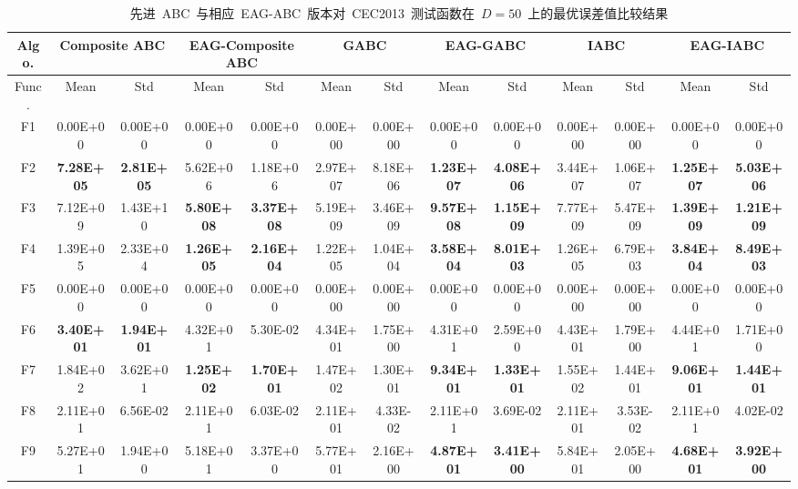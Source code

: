 \begin{table*}[!ht]
  \centering
  \caption{先进~ABC~与相应~EAG-ABC~版本对~CEC2013~测试函数在~$D=50$~上的最优误差值比较结果}
  \tiny
    \begin{tabular}{|c|cc|cc|cc|cc|cc|cc|}
    \hline
    Algo.   & \multicolumn{2}{c|}{Composite ABC} & \multicolumn{2}{c|}{EAG-Composite ABC} & \multicolumn{2}{c|}{ GABC } & \multicolumn{2}{c|}{EAG-GABC} & \multicolumn{2}{c|}{ IABC } & \multicolumn{2}{c|}{EAG-IABC} \\
    \hline
    Func.   & Mean  & Std   & Mean  & Std   &  Mean  &  Std  & Mean  & Std   &  Mean  &  Std  & Mean  & Std \\ \hline
    F1    & 0.00E+00 & 0.00E+00 & 0.00E+00 & 0.00E+00 & 0.00E+00 & 0.00E+00 & 0.00E+00 & 0.00E+00 & 0.00E+00 & 0.00E+00 & 0.00E+00 & 0.00E+00 \\
    F2    & \textbf{7.28E+05} & \textbf{2.81E+05} & 5.62E+06 & 1.18E+06 & 2.97E+07 & 8.18E+06 & \textbf{1.23E+07} & \textbf{4.08E+06} & 3.44E+07 & 1.06E+07 & \textbf{1.25E+07} & \textbf{5.03E+06} \\
    F3    & 7.12E+09 & 1.43E+10 & \textbf{5.80E+08} & \textbf{3.37E+08} & 5.19E+09 & 3.46E+09 & \textbf{9.57E+08} & \textbf{1.15E+09} & 7.77E+09 & 5.47E+09 & \textbf{1.39E+09} & \textbf{1.21E+09} \\
    F4    & 1.39E+05 & 2.33E+04 & \textbf{1.26E+05} & \textbf{2.16E+04} & 1.22E+05 & 1.04E+04 & \textbf{3.58E+04} & \textbf{8.01E+03} & 1.26E+05 & 6.79E+03 & \textbf{3.84E+04} & \textbf{8.49E+03} \\
    F5    & 0.00E+00 & 0.00E+00 & 0.00E+00 & 0.00E+00 & 0.00E+00 & 0.00E+00 & 0.00E+00 & 0.00E+00 & 0.00E+00 & 0.00E+00 & 0.00E+00 & 0.00E+00 \\
    \hline
    F6    & \textbf{3.40E+01} & \textbf{1.94E+01} & 4.32E+01 & 5.30E-02 & 4.34E+01 & 1.75E+00 & 4.31E+01 & 2.59E+00 & 4.43E+01 & 1.79E+00 & 4.44E+01 & 1.71E+00 \\
    F7    & 1.84E+02 & 3.62E+01 & \textbf{1.25E+02} & \textbf{1.70E+01} & 1.47E+02 & 1.30E+01 & \textbf{9.34E+01} & \textbf{1.33E+01} & 1.55E+02 & 1.44E+01 & \textbf{9.06E+01} & \textbf{1.44E+01} \\
    F8    & 2.11E+01 & 6.56E-02 & 2.11E+01 & 6.03E-02 & 2.11E+01 & 4.33E-02 & 2.11E+01 & 3.69E-02 & 2.11E+01 & 3.53E-02 & 2.11E+01 & 4.02E-02 \\
    F9    & 5.27E+01 & 1.94E+00 & 5.18E+01 & 3.37E+00 & 5.77E+01 & 2.16E+00 & \textbf{4.87E+01} & \textbf{3.41E+00} & 5.84E+01 & 2.05E+00 & \textbf{4.68E+01} & \textbf{3.92E+00} \\

\end{tabular}
\end{table*}
